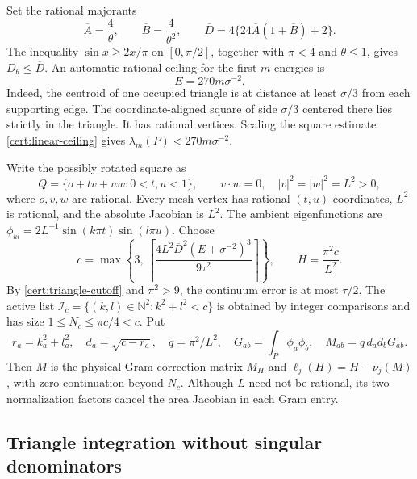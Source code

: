\documentclass[11pt,reqno]{amsart}
\numberwithin{equation}{section}
\newcommand{\N}{\mathbb N}
\begin{document}
Set the rational majorants
\begin{equation}\label{arith:constant-majorant}
 \overline A=\frac4\theta,\qquad
 \overline B=\frac4{\theta^2},\qquad
 \overline D=4\{24\overline A(1+\overline B)+2\}.
\end{equation}
The inequality $\sin x\ge2x/\pi$ on $[0,\pi/2]$, together
with $\pi<4$ and $\theta\le1$, gives
$D_\theta\le\overline D$.
An automatic rational ceiling for the first $m$ energies is
\begin{equation}\label{arith:triangle-ceiling}
 E=270m\sigma^{-2}.
\end{equation}
Indeed, the centroid of one occupied triangle is at distance
at least $\sigma/3$ from each supporting edge.  The
coordinate-aligned square of side $\sigma/3$ centered there
lies strictly in the triangle.  It has rational vertices.
Scaling the square estimate \eqref{cert:linear-ceiling} gives
$\lambda_m(P)<270m\sigma^{-2}$.

Write the possibly rotated square as
\[
 Q=\{o+t v+u w:0<t,u<1\},\qquad
 v\cdot w=0,\quad |v|^2=|w|^2=L^2>0,
\]
where $o,v,w$ are rational.  Every mesh vertex has rational
$(t,u)$ coordinates, $L^2$ is rational, and the absolute
Jacobian is $L^2$.  The ambient eigenfunctions are
$\phi_{kl}=2L^{-1}\sin(k\pi t)\sin(l\pi u)$.
Choose
\begin{equation}\label{arith:triangle-cutoff}
 c=\max\left\{3,\
    \left\lceil
       \frac{4L^2\overline D^2(E+\sigma^{-2})^3}
                       {9\tau^2}
    \right\rceil\right\},
 \qquad H=\frac{\pi^2c}{L^2}.
\end{equation}
By \eqref{cert:triangle-cutoff} and $\pi^2>9$, the continuum
error is at most $\tau/2$.  The active list
$\mathcal I_c=\{(k,l)\in\N^2:k^2+l^2<c\}$ is obtained by
integer comparisons and has size $1\le N_c\le\pi c/4<c$.
Put
\[
 r_a=k_a^2+l_a^2,\quad d_a=\sqrt{c-r_a},\quad
 q=\pi^2/L^2,\quad
 G_{ab}=\int_P\phi_a\phi_b,\quad M_{ab}=q\,d_ad_bG_{ab}.
\]
Then $M$ is the physical Gram correction matrix $M_H$ and
$\ell_j(H)=H-\nu_j(M)$, with zero continuation beyond $N_c$.
Although $L$ need not be rational, its two normalization
factors cancel the area Jacobian in each Gram entry.

\subsection{Triangle integration without singular denominators}
\label{arith:triangle-integrals}
\end{document}
